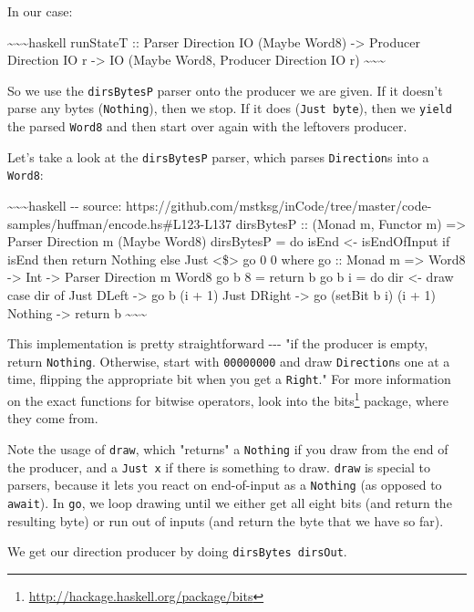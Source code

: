 \documentclass[]{article}
\renewcommand{\href}[2]{#2\footnote{\url{#1}}}
\begin{document}
In our case:

\textasciitilde{}\textasciitilde{}\textasciitilde{}haskell runStateT :: Parser
Direction IO (Maybe Word8) -\textgreater{} Producer Direction IO r
-\textgreater{} IO (Maybe Word8, Producer Direction IO r)
\textasciitilde{}\textasciitilde{}\textasciitilde{}

So we use the \texttt{dirsBytesP} parser onto the producer we are given. If it
doesn't parse any bytes (\texttt{Nothing}), then we stop. If it does
(\texttt{Just\ byte}), then we \texttt{yield} the parsed \texttt{Word8} and then
start over again with the leftovers producer.

Let's take a look at the \texttt{dirsBytesP} parser, which parses
\texttt{Direction}s into a \texttt{Word8}:

\textasciitilde{}\textasciitilde{}\textasciitilde{}haskell -\/- source:
https://github.com/mstksg/inCode/tree/master/code-samples/huffman/encode.hs\#L123-L137
dirsBytesP :: (Monad m, Functor m) =\textgreater{} Parser Direction m (Maybe
Word8) dirsBytesP = do isEnd \textless{}- isEndOfInput if isEnd then return
Nothing else Just \textless{}\$\textgreater{} go 0 0 where go :: Monad m
=\textgreater{} Word8 -\textgreater{} Int -\textgreater{} Parser Direction m
Word8 go b 8 = return b go b i = do dir \textless{}- draw case dir of Just DLeft
-\textgreater{} go b (i + 1) Just DRight -\textgreater{} go (setBit b i) (i + 1)
Nothing -\textgreater{} return b
\textasciitilde{}\textasciitilde{}\textasciitilde{}

This implementation is pretty straightforward -\/-\/- "if the producer is empty,
return \texttt{Nothing}. Otherwise, start with \texttt{00000000} and draw
\texttt{Direction}s one at a time, flipping the appropriate bit when you get a
\texttt{Right}." For more information on the exact functions for bitwise
operators, look into the \href{http://hackage.haskell.org/package/bits}{bits}
package, where they come from.

Note the usage of \texttt{draw}, which "returns" a \texttt{Nothing} if you draw
from the end of the producer, and a \texttt{Just\ x} if there is something to
draw. \texttt{draw} is special to parsers, because it lets you react on
end-of-input as a \texttt{Nothing} (as opposed to \texttt{await}). In
\texttt{go}, we loop drawing until we either get all eight bits (and return the
resulting byte) or run out of inputs (and return the byte that we have so far).

We get our direction producer by doing \texttt{dirsBytes\ dirsOut}.
\end{document}
